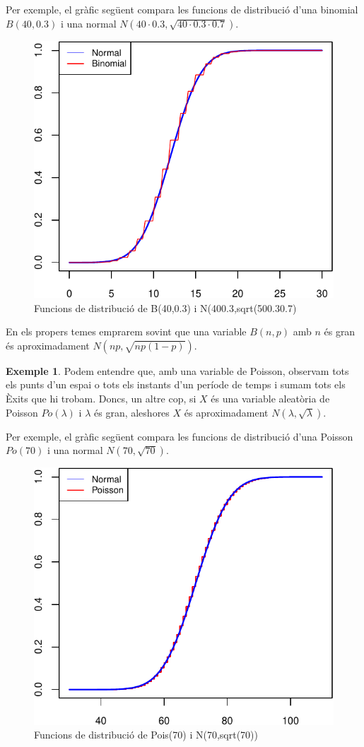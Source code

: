 \documentclass[
]{book}
\theoremstyle{definition}
\theoremstyle{definition}
\newtheorem{example}{Exemple}[chapter]
\theoremstyle{definition}
\theoremstyle{remark}
\begin{document}
Per exemple, el gràfic següent compara les funcions de distribució d'una binomial \(B(40,0.3)\) i una normal \(N(40\cdot 0.3,\sqrt{40\cdot 0.3\cdot 0.7})\).

\begin{figure}

{\centering \includegraphics[width=0.5\linewidth]{Bioestadistica-II_files/figure-latex/unnamed-chunk-69-1} 

}

\caption{Funcions de distribució de B(40,0.3) i N(400.3,sqrt(500.30.7)}\label{fig:unnamed-chunk-69}
\end{figure}

\begin{rmdrecordau}
En els propers temes emprarem sovint que una variable \(B(n,p)\) amb \(n\) és gran és aproximadament \(N(np,\sqrt{np(1-p)})\).
\end{rmdrecordau}

\begin{example}
\protect\hypertarget{exm:unnamed-chunk-71}{}{\label{exm:unnamed-chunk-71} }Podem entendre que, amb una variable de Poisson, observam tots els punts d'un espai o tots els instants d'un període de temps i sumam tots els Èxits que hi trobam. Doncs, un altre cop, si \(X\) és una variable aleatòria de Poisson \(Po(\lambda)\) i \(\lambda\) és gran, aleshores \(X\) és aproximadament \(N(\lambda,\sqrt{\lambda})\).
\end{example}

Per exemple, el gràfic següent compara les funcions de distribució d'una Poisson \(Po(70)\) i una normal \(N(70,\sqrt{70})\).

\begin{figure}

{\centering \includegraphics[width=0.5\linewidth]{Bioestadistica-II_files/figure-latex/unnamed-chunk-72-1} 

}

\caption{Funcions de distribució de Pois(70) i N(70,sqrt(70))}\label{fig:unnamed-chunk-72}
\end{figure}
\end{document}
